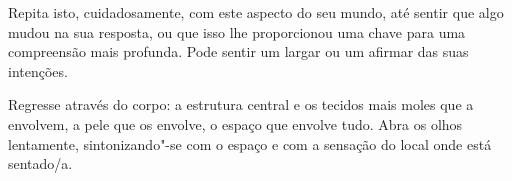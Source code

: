 Repita isto, cuidadosamente, com este aspecto do seu mundo, até sentir que algo
mudou na sua resposta, ou que isso lhe proporcionou uma chave para uma
compreensão mais profunda. Pode sentir um largar ou um afirmar das suas
intenções.

Regresse através do corpo: a estrutura central e os tecidos mais moles que a
envolvem, a pele que os envolve, o espaço que envolve tudo. Abra os olhos
lentamente, sintonizando"-se com o espaço e com a sensação do local onde está
sentado/a.
